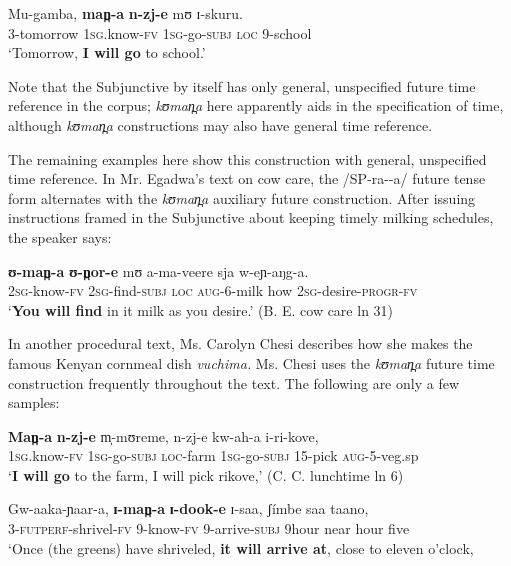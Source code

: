 \documentclass[output=paper]{langsci/langscibook}
\begin{document}
\ea\label{ex:sarvasy:20}
\gll Mu-gamba,   \textbf{man̪-a}    \textbf{n-zj-e}    mʊ  ɪ-skuru. \\
3-tomorrow  \textsc{1sg.}know-\textsc{fv}  \textsc{1sg}-go-\textsc{subj}  \textsc{loc}  9-school \\
\glt ‘Tomorrow, \textbf{I will go} to school.’
\z

Note that the Subjunctive by itself has only general, unspecified future time reference in the corpus; \textit{kʊman̪a} here apparently aids in the specification of time, although \textit{kʊman̪a} constructions may also have general time reference. 

The remaining examples here show this construction with general, unspecified time reference. In Mr. Egadwa’s text on cow care, the /SP-ra-{\longrule}-a/ future tense form alternates with the \textit{kʊman̪a} auxiliary future construction. After issuing instructions framed in the Subjunctive about keeping timely milking schedules, the speaker says: 

\ea\label{ex:sarvasy:21}
\gll \textbf{ʊ-man̪-a}   \textbf{ʊ-n̪or-e}     mʊ   a-ma-veere   sja   w-eɲ-aŋg-a. \\
\textsc{2sg-}know-\textsc{fv}  \textsc{2sg}-find-\textsc{subj}  \textsc{loc}  \textsc{aug-}6-milk  how  \textsc{2sg}-desire-\textsc{progr}-\textsc{fv} \\
\glt ‘\textbf{You will find} in it milk as you desire.’ (B. E. cow care ln 31)
\z

In another procedural text, Ms. Carolyn Chesi describes how she makes the famous Kenyan cornmeal dish \textit{vuchima.} Ms. Chesi uses the \textit{kʊman̪a} future time construction frequently throughout the text. The following are only a few samples:

\ea\label{ex:sarvasy:22}
\gll \textbf{Man̪-a}     \textbf{n-zj-e}     m̩-mʊreme,   n-zj-e     kw-ah-a     i-ri-kove, \\
\textsc{1sg}.know-\textsc{fv}  \textsc{1sg}-go-\textsc{subj}  \textsc{loc}-farm  \textsc{1sg}-go-\textsc{subj}  15-pick    \textsc{aug}-5-veg.sp \\
\glt ‘\textbf{I will go} to the farm, I will pick rikove,’ (C. C. lunchtime ln 6)
\z

\ea\label{ex:sarvasy:23}
\gll Gw-aaka-ɲaar-a,   \textbf{ɪ-man̪-a}   \textbf{ɪ-dook-e}   ɪ-saa,   ʃ\'{i}mbe   saa   taano, \\
3-\textsc{futperf-}shrivel-\textsc{fv}  9-know-\textsc{fv}  9-arrive-\textsc{subj}    9hour    near  hour  five \\
\glt ‘Once (the greens) have shriveled, \textbf{it will arrive at}, close to eleven o’clock,
\end{document}
